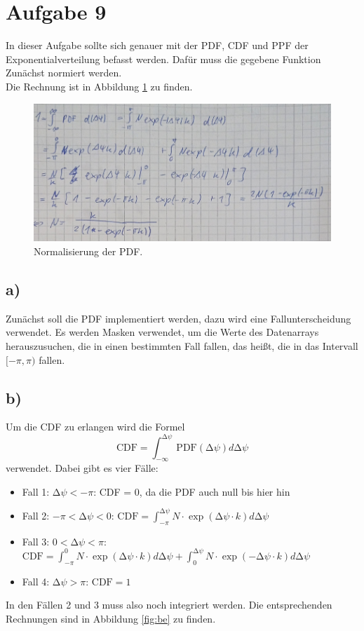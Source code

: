 \section{Aufgabe 9}

In dieser Aufgabe sollte sich genauer mit der PDF, CDF und PPF der Exponentialverteilung befasst werden. Dafür muss die gegebene Funktion Zunächst
normiert werden. \\
Die Rechnung ist in Abbildung \ref{fig:normalize} zu finden.

\begin{figure}
    \centering
    \includegraphics[width=\textwidth]{Aufgabe9/Norm.png}
    \caption{Normalisierung der PDF.}
    \label{fig:normalize}
\end{figure}
\FloatBarrier

\subsection{a)}
    Zunächst soll die PDF implementiert werden, dazu wird eine Fallunterscheidung verwendet. Es werden Masken verwendet,
    um die Werte des Datenarrays herauszusuchen, die in einen bestimmten Fall fallen, das heißt, die in das Intervall 
    $[-\pi, \pi)$ fallen.

\subsection{b)}
    Um die CDF zu erlangen wird die Formel
    \begin{equation*}
        \text{CDF} = \int_{-\infty}^{\increment \psi} \text{PDF}(\increment \psi) d\increment\psi 
    \end{equation*}
    verwendet. Dabei gibt es vier Fälle:
    \begin{itemize}
        \item Fall 1: $\increment\psi < -\pi$: CDF = 0, da die PDF auch null bis hier hin
        \item Fall 2: $-\pi < \increment \psi < 0$: $\text{CDF} = \int_{-\pi}^{\increment\psi} N \cdot \exp(\increment \psi \cdot k) d\increment\psi$
        \item Fall 3: $0 < \increment \psi < \pi$: $\text{CDF} = \int_{-\pi}^{0} N \cdot \exp(\increment \psi \cdot k) d\increment\psi + \int_{0}^{\increment\psi} N \cdot \exp(- \increment \psi \cdot k) d\increment\psi$
        \item Fall 4: $\increment \psi > \pi$: $\text{CDF} = 1$
    \end{itemize}
    In den Fällen 2 und 3 muss also noch integriert werden. Die entsprechenden Rechnungen sind in Abbildung \ref{fig:be} zu finden.
    
